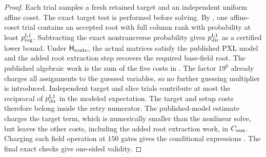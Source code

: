 \begin{proof}
Each trial samples a fresh retained target and an independent uniform affine
coset.
The exact target test is performed before solving.  By
, one affine-coset trial contains an accepted root
with full column rank with probability at least
$p_{\rm reg}^{\rm L1}$.  Subtracting the exact nontransverse probability gives
$p_{\rm dir}^{\rm L1}$ as a certified lower bound.  Under
$\mathsf H_{\rm route}$, the actual matrices satisfy the published PXL model
and the added root extraction step recovers the required base-field root.  The
published algebraic work is the sum of the five costs in
.  The factor
$19^k$ already charges all assignments to the guessed variables, so no further
guessing multiplier is introduced.  Independent target and slice trials
contribute at most the reciprocal of $p_{\rm dir}^{\rm L1}$ in the modeled
expectation.  The target and setup
costs therefore belong inside the retry numerator.  The published-model
estimate charges the target term,
which is numerically smaller than the nonlinear solve, but leaves the other
costs, including the added root extraction work, in $C_{\rm aux}$.  Charging
each field operation at $150$ gates gives
the conditional expressions
.  The final exact checks give
one-sided validity.
\end{proof}


